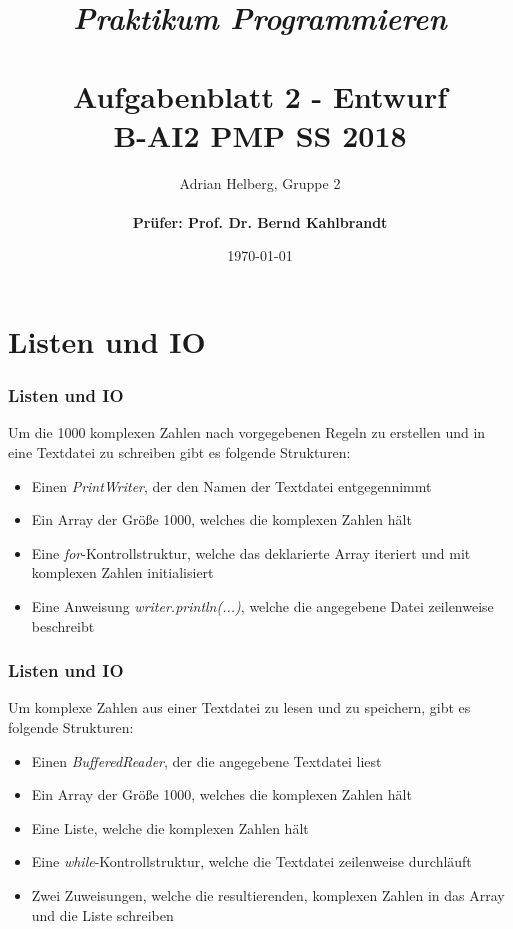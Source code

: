 \documentclass{beamer}
\title{
	\textit{Praktikum Programmieren} \\
	\textbf{\\Aufgabenblatt 2 - Entwurf} \\
	\scriptsize{B-AI2 PMP SS 2018}
}
\author{Adrian Helberg, Gruppe 2 \\\textbf{\\ Prüfer: Prof. Dr. Bernd Kahlbrandt}}
\date{\today}
\begin{document}

\maketitle

\frame{\tableofcontents}

\section{Listen und IO}
\begin{frame}
\frametitle{Listen und IO}

Um die 1000 komplexen Zahlen nach vorgegebenen Regeln zu erstellen und in eine Textdatei zu schreiben gibt es folgende Strukturen:

\begin{itemize}
\item Einen \textit{PrintWriter}, der den Namen der Textdatei entgegennimmt
\item Ein Array der Gr\"oße 1000, welches die komplexen Zahlen h\"alt
\item Eine \textit{for}-Kontrollstruktur, welche das deklarierte Array iteriert und mit komplexen Zahlen initialisiert
\item Eine Anweisung \textit{writer.println(...)}, welche die angegebene Datei zeilenweise beschreibt
\end{itemize}

\end{frame}

\begin{frame}
\frametitle{Listen und IO}

Um komplexe Zahlen aus einer Textdatei zu lesen und  zu speichern, gibt es folgende Strukturen:

\begin{itemize}
\item Einen \textit{BufferedReader}, der die angegebene Textdatei liest
\item Ein Array der Gr\"oße 1000, welches die komplexen Zahlen h\"alt
\item Eine Liste, welche die komplexen Zahlen h\"alt
\item Eine \textit{while}-Kontrollstruktur, welche die Textdatei zeilenweise durchl\"auft
\item Zwei Zuweisungen, welche die resultierenden, komplexen Zahlen in das Array und die Liste schreiben
\end{itemize}

\end{frame}
\end{document}
